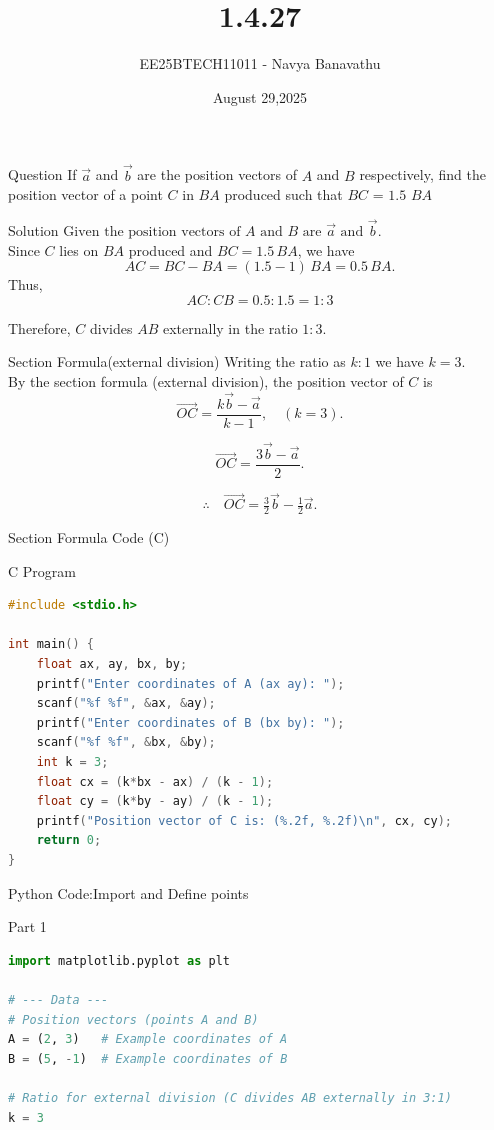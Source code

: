 \documentclass{beamer}
\title{1.4.27}
\date{August 29,2025}
\author{EE25BTECH11011 - Navya Banavathu}
\begin{document}
\frame{\titlepage}

\begin{frame}{Question}
If $\vec{a}$ and $\vec{b}$ are the position vectors of $A$ and $B$ respectively, find the position vector of a point $C$ in $BA$ produced such that $BC$ = $1.5$ $BA$
\end{frame}

\begin{frame}{Solution}
$\text{Given the position vectors of } A \text{ and } B \text{ are } \vec{a} \text{ and } \vec{b}.$ \\[6pt]

Since $C$ lies on $BA$ produced and $BC = 1.5\, BA$, we have
\[
 AC = BC - BA = (1.5 - 1)\,BA = 0.5\,BA.
\]
Thus,
\[
 AC : CB = 0.5 : 1.5 = 1 : 3
\]

Therefore, $C$ divides $AB$ externally in the ratio $1:3$.
\end{frame}

\begin{frame}{Section Formula(external division)}
Writing the ratio as $k:1$ we have $k=3$. \\[8pt]

By the section formula (external division), the position vector of $C$ is
\[
\vec{OC} = \frac{k\vec{b} - \vec{a}}{k-1}, \quad (k=3).
\]

\[
\vec{OC} = \frac{3\vec{b} - \vec{a}}{2}.
\]

\[
\therefore \quad \vec{OC} = \tfrac{3}{2}\vec{b} - \tfrac{1}{2}\vec{a}.
\]
\end{frame}


\begin{frame}[fragile]{Section Formula Code (C)}
\begin{block}{C Program}
\begin{lstlisting}[language=C, basicstyle=\ttfamily\small, keywordstyle=\color{blue}, frame=single]
#include <stdio.h>

int main() {
    float ax, ay, bx, by;
    printf("Enter coordinates of A (ax ay): ");
    scanf("%f %f", &ax, &ay);
    printf("Enter coordinates of B (bx by): ");
    scanf("%f %f", &bx, &by);
    int k = 3;
    float cx = (k*bx - ax) / (k - 1);
    float cy = (k*by - ay) / (k - 1);
    printf("Position vector of C is: (%.2f, %.2f)\n", cx, cy);
    return 0;
}
\end{lstlisting}
\end{block}
\end{frame}


\begin{frame}[fragile]{Python Code:Import and Define points}
\begin{block}{Part 1}
\begin{lstlisting}[language=Python, basicstyle=\ttfamily\small, keywordstyle=\color{blue}, frame=single]
import matplotlib.pyplot as plt

# --- Data ---
# Position vectors (points A and B)
A = (2, 3)   # Example coordinates of A
B = (5, -1)  # Example coordinates of B

# Ratio for external division (C divides AB externally in 3:1)
k = 3   
\end{lstlisting}
\end{block}
\end{frame}
\end{document}
